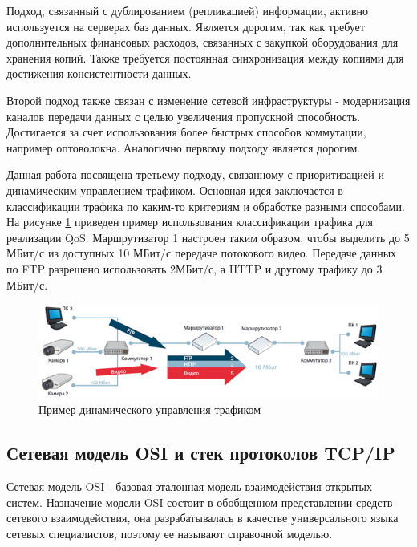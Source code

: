 Подход, связанный с дублированием (репликацией) информации, активно используется на серверах баз данных. Является дорогим, так как требует дополнительных финансовых расходов, связанных с закупкой оборудования для хранения копий. Также требуется постоянная синхронизация между копиями для достижения консистентности данных.

Второй подход также связан с изменение сетевой инфраструктуры - модернизация каналов передачи данных с целью увеличения пропускной способность. Достигается за счет использования более быстрых способов коммутации, например оптоволокна. Аналогично первому подходу является дорогим.

Данная работа посвящена третьему подходу, связанному с приоритизацией и динамическим управлением трафиком. Основная идея заключается в классификации трафика по каким-то критериям и обработке разными способами. На рисунке \ref{pic:qos_simple_example} приведен пример использования классификации трафика для реализации QoS. Маршрутизатор 1 настроен таким образом, чтобы выделить до 5 МБит/с из доступных 10 МБит/с передаче потокового видео. Передаче данных по FTP разрешено использовать 2МБит/с, а HTTP и другому трафику до 3 МБит/с.
\begin{figure}
\centering
\includegraphics[scale=0.7]{pictures/qos_simple_example}
\caption{Пример динамического управления трафиком}
\label{pic:qos_simple_example}
\end{figure}

\subsection{Сетевая модель OSI и стек протоколов TCP/IP}
Сетевая модель OSI - базовая эталонная модель взаимодействия открытых систем. Назначение модели OSI состоит в обобщенном представлении средств сетевого взаимодействия, она разрабатывалась в качестве универсального языка сетевых специалистов, поэтому ее называют справочной моделью.

